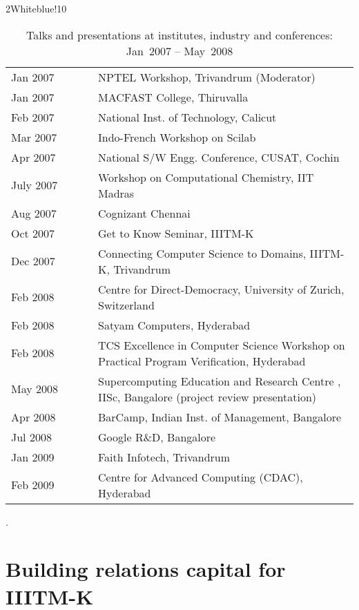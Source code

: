 \documentclass[titlepage, %
11pt, 
]{article}
\begin{document}
\begin{table}
\rowcolors%
{2}{White}{blue!10}
\setlength\extrarowheight{4pt}
\begin{tabular}%
{|p{0.25\linewidth}|p{0.75\linewidth}|}
\hline
\multicolumn{1}{|m{0.25\linewidth}|}{\centering {\bf Year}}&
\multicolumn{1}{m{0.75\linewidth}|}{\centering {\bf Event, Location}}\\
\hline
Jan  2007 & NPTEL Workshop, Trivandrum (Moderator)\\
Jan  2007 & MACFAST College, Thiruvalla\\
Feb  2007 & National Inst. of Technology, Calicut\\
Mar  2007 & Indo-French Workshop on Scilab\\
Apr  2007 & National S/W Engg. Conference, CUSAT, Cochin\\
July 2007 & Workshop on Computational Chemistry, IIT Madras\\
Aug  2007 & Cognizant Chennai\\
Oct  2007 & Get to Know Seminar, IIITM-K\\
Dec  2007 & Connecting Computer Science to Domains, IIITM-K, Trivandrum\\
\hline
Feb 2008 & Centre for Direct-Democracy, University of Zurich, Switzerland\\
Feb 2008 & Satyam Computers, Hyderabad\\
Feb 2008 & TCS Excellence in Computer Science Workshop on Practical Program Verification, Hyderabad\\
May 2008 & Supercomputing Education and Research Centre , IISc, Bangalore (project review presentation)\\
Apr 2008 & BarCamp, Indian Inst. of Management, Bangalore\\
Jul 2008 & Google R\&D, Bangalore\\
\hline
Jan 2009 & Faith Infotech, Trivandrum\\
Feb 2009 & Centre for Advanced Computing (CDAC), Hyderabad\\
\hline
\end{tabular}
\caption{Talks and presentations at institutes, industry and conferences:  Jan~2007 -- May~2008\label{tbl:talks-2}}.
\end{table}

\section{Building relations capital for IIITM-K}
\end{document}
